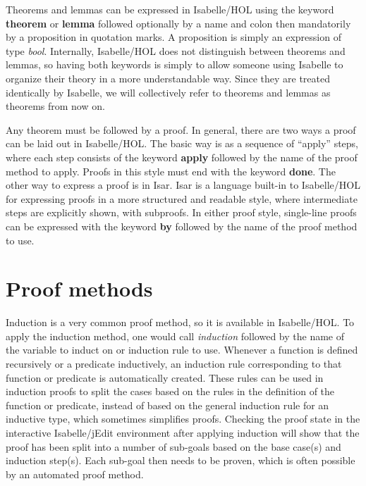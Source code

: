 \documentclass{article}
\begin{document}
Theorems and lemmas can be expressed in Isabelle/HOL using the keyword
\textbf{theorem} or \textbf{lemma} followed optionally by a name and colon then
mandatorily by a proposition in quotation
marks. A proposition is simply an expression of type \textit{bool}. Internally,
Isabelle/HOL does not distinguish between theorems and lemmas, so having both
keywords is simply to allow someone using Isabelle to organize their theory in
a more understandable way. Since they are treated identically by Isabelle, we
will collectively refer to theorems and lemmas as theorems from now on.

Any theorem must be followed by a proof. In general, there are two ways a proof
can be laid out in Isabelle/HOL. The basic way is as a sequence of ``apply''
steps, where each step consists of the keyword \textbf{apply} followed by the
name of the proof method to apply. Proofs in this style must end with the
keyword \textbf{done}. The other way to express a proof is in Isar. Isar is a
language built-in to Isabelle/HOL for expressing proofs in a more structured
and readable style, where intermediate steps are explicitly shown, with
subproofs. In either proof style, single-line proofs can be expressed with the
keyword \textbf{by} followed by the name of the proof method to use.

\section{Proof methods}

Induction is a very common proof method, so it is available in Isabelle/HOL. To
apply the induction method, one would call \textit{induction} followed by the 
name of the variable to induct on or induction rule to use. Whenever a function 
is defined recursively or a predicate inductively, an induction rule 
corresponding to that function or predicate is automatically created. These 
rules can be used in induction proofs to split the cases based on the rules in 
the definition of the function or predicate, instead of based on the general 
induction rule for an inductive type, which sometimes simplifies proofs. 
Checking the proof state in the interactive Isabelle/jEdit environment after 
applying induction will show that the proof has been split into a number of 
sub-goals based on the base case(s) and induction step(s). Each sub-goal then 
needs to be proven, which is often possible by an automated proof method.
\end{document}
